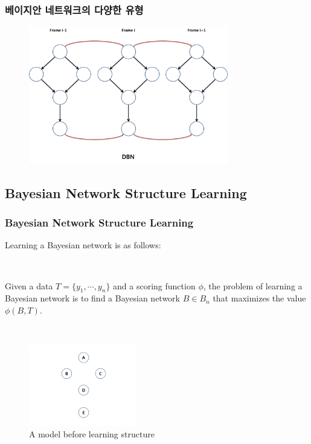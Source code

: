 \documentclass{beamer}
\begin{document}
\begin{frame}[fragile]
\frametitle{베이지안 네트워크의 다양한 유형}

	\begin{figure}
		\includegraphics[height=170pt]{images/image110}
	\end{figure}

\end{frame}





\subsection{Bayesian Network Structure Learning}
\begin{frame}
\frametitle{Bayesian Network Structure Learning}
{\scriptsize{}

Learning a Bayesian network is as follows:

{}\

Given a data $T = \{y_{1}, \cdots, y_{n}\}$ and a scoring function $\phi$, the problem of learning a Bayesian network is to find a Bayesian network $B \in B_{n}$ that maximizes the value $\phi(B, T)$.

{}\

\begin{figure}[!h]
	\centering
		\includegraphics[height=100pt]{images/image02}
		\caption{{\scriptsize{}A model before learning structure}}
\end{figure}	
}
\end{frame}
\end{document}
